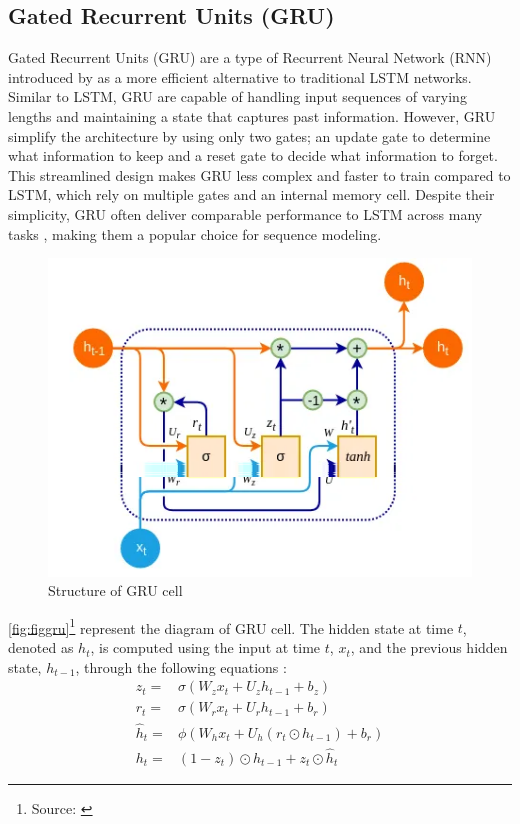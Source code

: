 \documentclass[]{interact}
\theoremstyle{plain}%
\theoremstyle{definition}
\theoremstyle{remark}
\begin{document}
\subsection{Gated Recurrent Units
(GRU)}\label{gated-recurrent-units-gru}

Gated Recurrent Units (GRU) are a type of Recurrent Neural Network (RNN)
introduced by \citep{chung2014} as a more efficient alternative to
traditional LSTM networks. Similar to LSTM, GRU are capable of handling
input sequences of varying lengths and maintaining a state that captures
past information. However, GRU simplify the architecture by using only
two gates; an update gate to determine what information to keep and a
reset gate to decide what information to forget. This streamlined design
makes GRU less complex and faster to train compared to LSTM, which rely
on multiple gates and an internal memory cell. Despite their simplicity,
GRU often deliver comparable performance to LSTM across many tasks
\citep{yang2020}, making them a popular choice for sequence modeling.

\begin{figure}

{\centering \includegraphics[width=0.75\linewidth]{GRU} 

}

\caption{Structure of GRU cell}\label{fig:figgru}
\end{figure}

\autoref{fig:figgru}\footnote{Source: \citep{vasilev2019}} represent the
diagram of GRU cell. The hidden state at time \(t\), denoted as \(h_t\),
is computed using the input at time \(t\), \(x_t\), and the previous
hidden state, \(h_{t-1}\), through the following equations
\citep{dey2017}: \begin{align}
z_t= & \sigma\left(W_z x_t+U_z h_{t-1}+b_z \right)\\
r_t= & \sigma\left(W_r x_t+U_rh_{t-1}+b_r \right)\\
\widehat{h}_t= & \phi\left(W_hx_t+U_h(r_t \odot h_{t-1})+b_r \right)\\
h_t= & (1-z_t)\odot h_{t-1}+z_t \odot \widehat{h}_{t}
\end{align}
\end{document}
